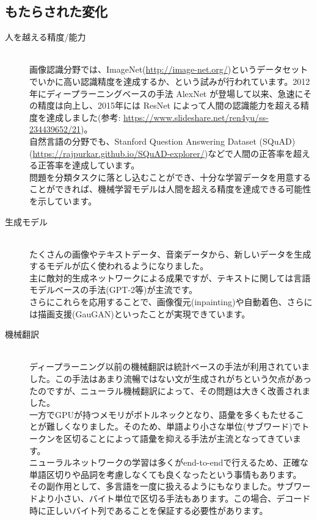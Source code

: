 \documentclass[mingoth,a4paper]{jsarticle}
\begin{document}
\subsection{もたらされた変化}

\begin{description}
\item[人を越える精度/能力] \mbox{} \\
  画像認識分野では、ImageNet(\url{http://image-net.org/})というデータセットでいかに高い認識精度を達成するか、という試みが行われています。2012年にディープラーニングベースの手法 AlexNet が登場して以来、急速にその精度は向上し、2015年には ResNet によって人間の認識能力を超える精度を達成しました(参考: \url{https://www.slideshare.net/ren4yu/ss-234439652/21})。\\
  自然言語の分野でも、Stanford Question Answering Dataset (SQuAD) (\url{https://rajpurkar.github.io/SQuAD-explorer/})などで人間の正答率を超える正答率を達成しています。\\
  問題を分類タスクに落とし込むことができ、十分な学習データを用意することができれば、機械学習モデルは人間を超える精度を達成できる可能性を示しています。
\item[生成モデル] \mbox{} \\
  たくさんの画像やテキストデータ、音楽データから、新しいデータを生成するモデルが広く使われるようになりました。\\
  主に敵対的生成ネットワークによる成果ですが、テキストに関しては言語モデルベースの手法(GPT-2等)が主流です。\\
  さらにこれらを応用することで、画像復元(inpainting)や自動着色、さらには描画支援(GauGAN)といったことが実現できています。
\item[機械翻訳] \mbox{} \\
  ディープラーニング以前の機械翻訳は統計ベースの手法が利用されていました。この手法はあまり流暢ではない文が生成されがちという欠点があったのですが、ニューラル機械翻訳によって、その問題は大きく改善されました。\\
  一方でGPUが持つメモリがボトルネックとなり、語彙を多くもたせることが難しくなりました。そのため、単語より小さな単位(サブワード)でトークンを区切ることによって語彙を抑える手法が主流となってきています。\\
  ニューラルネットワークの学習は多くがend-to-endで行えるため、正確な単語区切りや品詞を考慮しなくても良くなったという事情もあります。\\
  その副作用として、多言語を一度に扱えるようにもなりました。サブワードより小さい、バイト単位で区切る手法もあります。この場合、デコード時に正しいバイト列であることを保証する必要性があります。
\end{description}
\end{document}
